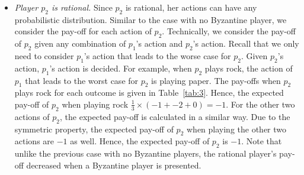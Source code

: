 \begin{itemize}
	
	\item {\textit{Player $p_2$ is rational.}} Since $p_2$ is rational, her actions can have any probabilistic distribution.
	Similar to the case with no Byzantine player, we consider the pay-off for each action of $p_2$. Technically, we consider the pay-off of $p_2$ given any  combination of $p_1$'s action and $p_2$'s action. Recall that we only need to consider $p_1$'s action that leads to the worse case for $p_2$. Given $p_2$'s action, $p_1$'s action is decided. For example, when $p_2$ plays rock, the action of $p_1$ that leads to the worst case for $p_2$ is playing paper. The pay-offs when $p_2$ plays rock for each outcome is given in Table~\ref{tab:3}. Hence, the expected pay-off of $p_2$ when playing rock $\frac{1}{3} \times (-1 + -2 + 0) = -1$. For the other two actions of $p_2$, the expected pay-off is calculated in a similar way. Due to the symmetric property, the expected pay-off of $p_2$ when playing the other two actions are $-1$ as well. Hence, the expected pay-off of $p_2$ is $-1$. Note that unlike the previous case with no Byzantine players, the rational player's pay-off decreased when a Byzantine player is presented.
		
	

\end{itemize}
